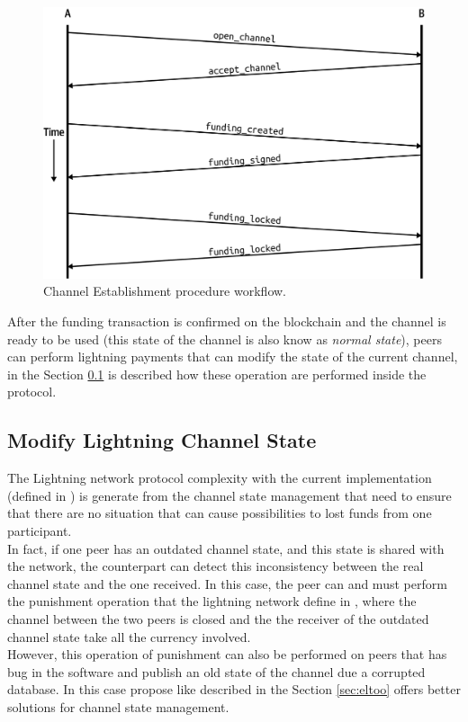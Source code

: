 \begin{figure}[h]
  \begin{center}
  \includegraphics[width=0.6\columnwidth]{imgs/mtln_0703.png}
  \end{center}
  \caption{Channel Establishment procedure workflow.}
  \label{fig:channel-establishment}
\end{figure}

After the funding transaction is confirmed on the blockchain and the channel is ready to be used (this state of the channel is also know as \emph{normal state}),
peers can perform lightning payments that can modify the state of the current channel, in the Section \ref{sec:modify_channel_state} is described how
these operation are performed inside the protocol.

\subsection{Modify Lightning Channel State}
\label{sec:modify_channel_state}

The Lightning network protocol complexity with the current implementation (defined in \cite{lightning-bolts})
is generate from the channel state management that need to ensure that there are no situation that can
cause  possibilities to lost funds from one participant.\\
In fact, if one peer has an outdated channel state, and this state is shared with the network, the counterpart can
detect this inconsistency between the real channel state and the one received. In this case, the peer can and must
perform the punishment operation that the lightning network define in \cite{bolt2}, where the channel between the two peers
is closed and the the receiver of the outdated channel state take all the currency involved.\\
However, this operation of punishment can also be performed on peers that has bug in the software and publish an old state of the
channel due a corrupted database. In this case propose like \cite{eltoo} described in the Section \ref{sec:eltoo} offers
better solutions for channel state management.

